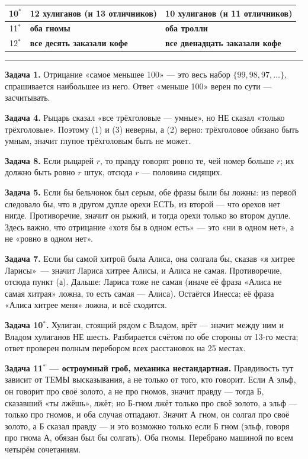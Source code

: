 \documentclass[10pt,a4paper]{article}
\begin{document}
\begin{tabular}{@{}c|p{8.1cm}|p{8.1cm}@{}}
10$^*$ & \textbf{12 хулиганов} (и 13 отличников) & \textbf{10 хулиганов} (и 11 отличников)\\ \hline
11$^*$ & \textbf{оба гномы} & \textbf{оба тролли}\\ \hline
12$^*$ & \textbf{все десять заказали кофе} & \textbf{все двенадцать заказали кофе}\\
\end{tabular}

\vspace{9pt}\hrule\vspace{6pt}

\textbf{Задача 1.} Отрицание «самое меньшее 100» --- это весь набор $\{99, 98, 97, \ldots\}$,
спрашивается наибольшее из него. Ответ «меньше 100» верен по сути --- засчитывать.

\vspace{2pt}
\textbf{Задача 4.} Рыцарь сказал «все трёхголовые --- умные», но НЕ сказал «только трёхголовые».
Поэтому (1) и (3) неверны, а (2) верно: трёхголовое обязано быть умным, значит глупое
трёхголовым быть не может.

\vspace{2pt}
\textbf{Задача 8.} Если рыцарей $r$, то правду говорят ровно те, чей номер больше $r$;
их должно быть ровно $r$ штук, отсюда $r$ --- половина сидящих.

\vspace{2pt}
\textbf{Задача 5.} Если бы бельчонок был серым, обе фразы были бы ложны: из первой следовало бы,
что в другом дупле орехи ЕСТЬ, из второй --- что орехов нет нигде. Противоречие, значит он рыжий,
и тогда орехи только во втором дупле. Здесь важно, что отрицание «хотя бы в одном есть» --- это
«ни в одном нет», а не «ровно в одном нет».

\vspace{2pt}
\textbf{Задача 7.} Если бы самой хитрой была Алиса, она солгала бы, сказав «я хитрее Ларисы»~---
значит Лариса хитрее Алисы, и Алиса не самая. Противоречие, отсюда пункт (а). Дальше:
Лариса тоже не самая (иначе её фраза «Алиса не самая хитрая» ложна, то есть самая --- Алиса).
Остаётся Инесса; её фраза «Алиса хитрее меня» ложна, и всё сходится.

\vspace{2pt}
\textbf{Задача 10$^*$.} Хулиган, стоящий рядом с Владом, врёт --- значит между ним и Владом
хулиганов НЕ шесть. Разбирается счётом по обе стороны от 13-го места; ответ проверен полным
перебором всех расстановок на 25 местах.

\vspace{2pt}
\textbf{Задача 11$^*$ --- остроумный гроб, механика нестандартная.} Правдивость тут зависит
от ТЕМЫ высказывания, а не только от того, кто говорит. Если А эльф, он говорит про своё золото,
а не про гномов, значит правду --- тогда Б, сказавший «ты лжёшь», лжёт; но Б-гном лжёт только
про своё золото, а эльф --- только про гномов, и оба случая отпадают.
Значит А гном, он солгал про своё золото, а Б сказал правду --- и это возможно только если
Б гном (эльф, говоря про гнома А, обязан был бы солгать). Оба гномы. Перебрано машиной
по всем четырём сочетаниям.
\end{document}
